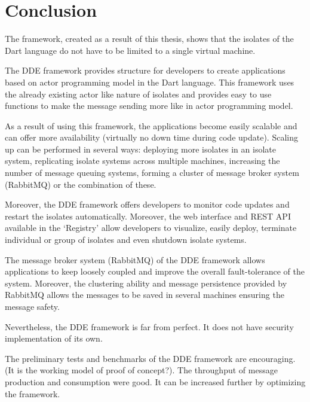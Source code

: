 \chapter{Conclusion}\label{chapter:conclusion}

  The framework, created as a result of this thesis, shows that the isolates of the Dart language do not have to be limited to a single virtual machine.

  The DDE framework provides structure for developers to create applications based on actor programming model in the Dart language. This framework uses the already existing actor like nature of isolates and provides easy to use functions to make the message sending more like in actor programming model.

  As a result of using this framework, the applications become easily scalable and can offer more availability (virtually no down time during code update). Scaling up can be performed in several ways: deploying more isolates in an isolate system, replicating isolate systems across multiple machines, increasing the number of message queuing systems, forming a cluster of message broker system (RabbitMQ) or the combination of these.

  Moreover, the DDE framework offers developers to monitor code updates and restart the isolates automatically. Moreover, the web interface and REST API available in the ‘Registry’ allow developers to visualize, easily deploy, terminate individual or group of isolates and even shutdown isolate systems.

  The message broker system (RabbitMQ) of the DDE framework allows applications to keep loosely coupled and improve the overall fault-tolerance of the system. Moreover, the clustering ability and message persistence provided by RabbitMQ allows the messages to be saved in several machines ensuring the message safety.

  Nevertheless, the DDE framework is far from perfect. It does not have security implementation of its own.

  The preliminary tests and benchmarks of the DDE framework are encouraging. (It is the working model of proof of concept?). The throughput of message production and consumption were good. It can be increased further by optimizing the framework.
